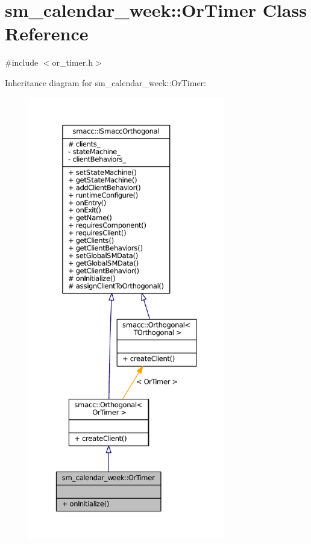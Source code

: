\hypertarget{classsm__calendar__week_1_1OrTimer}{}\section{sm\+\_\+calendar\+\_\+week\+:\+:Or\+Timer Class Reference}
\label{classsm__calendar__week_1_1OrTimer}


{\ttfamily \#include $<$or\+\_\+timer.\+h$>$}



Inheritance diagram for sm\+\_\+calendar\+\_\+week\+:\+:Or\+Timer\+:
\nopagebreak
\begin{figure}[H]
\begin{center}
\leavevmode
\includegraphics[height=550pt]{classsm__calendar__week_1_1OrTimer__inherit__graph}
\end{center}
\end{figure}


